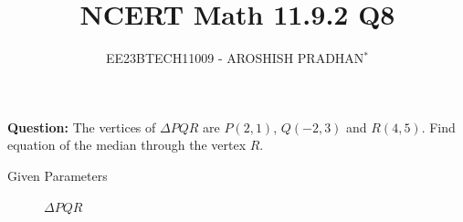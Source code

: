 \documentclass[journal,12pt,twocolumn]{IEEEtran}
\theoremstyle{remark}
\begin{document}

\vspace{3cm}

\title{NCERT Math 11.9.2 Q8}
\author{EE23BTECH11009 - AROSHISH PRADHAN$^{*}$%
}
\maketitle
\newpage
\bigskip
\textbf{Question:} The vertices of $\Delta PQR$ are $P(2, 1)$, $Q(-2, 3)$ and $R(4, 5)$. Find equation of the median through the vertex $R$.\\

\solution
\begin{table}[!h]
    \centering
    
    \caption{Given Parameters}
    \label{tab:1}
\end{table}
\begin{figure}[!h]
    \centering
    
    \caption{$\Delta PQR$}
    \label{fig:1}
\end{figure}
\end{document}
